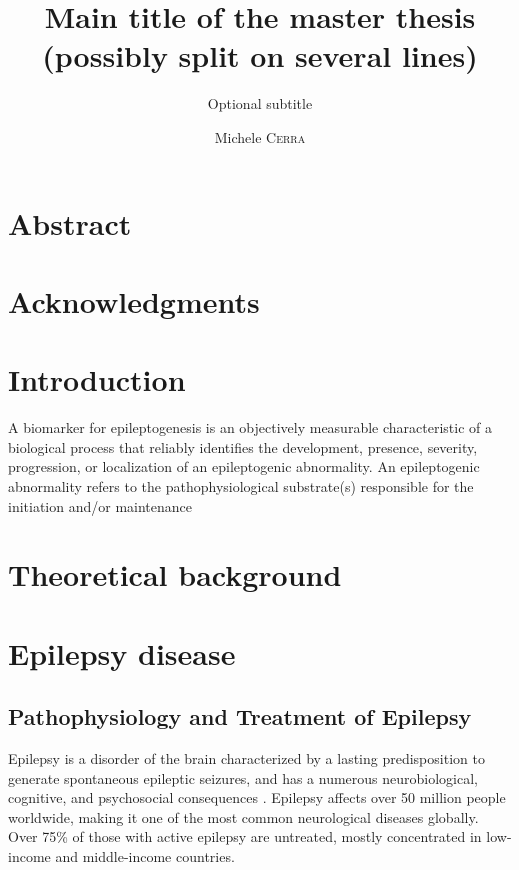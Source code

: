 \documentclass{EPL-master-thesis-covers-EN}
\title{Main title of the master thesis (possibly split on several lines)}
\subtitle{Optional subtitle}
\author{Michele \textsc{Cerra}}
\begin{document}
  \maketitle
  \frontmatter %

  \chapter*{Abstract}
  
  \chapter*{Acknowledgments}

  \tableofcontents

  \mainmatter %
  \chapter*{Introduction}
  A biomarker for epileptogenesis is an objectively measurable characteristic of a biological process that reliably identifies the development, presence, severity, progression, or localization of an epileptogenic abnormality. An epileptogenic abnormality refers to the pathophysiological substrate(s) responsible for the initiation and/or maintenance

  \chapter{Theoretical background}

  \chapter{Epilepsy disease}
  \section{Pathophysiology and Treatment of Epilepsy}
  Epilepsy is a disorder of the brain characterized by a lasting predisposition to generate spontaneous epileptic seizures, and has a numerous neurobiological, cognitive, and psychosocial consequences \cite{defEpilepsy}.
  Epilepsy affects over 50 million people worldwide, making it one of the most common neurological diseases globally. Over 75\% of those with active epilepsy are untreated, mostly concentrated in low-income and middle-income countries. \cite{defeating_epilepsy}
\end{document}
